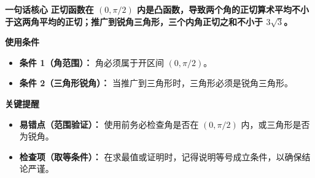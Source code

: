 \begin{summarybox}
\textbf{\textcolor{CSummary}{一句话核心}}
\textbf{正切函数在 $(0, \pi/2)$ 内是凸函数，导致两个角的正切算术平均不小于这两角平均的正切；推广到锐角三角形，三个内角正切之和不小于 $3\sqrt{3}$。}

\medskip
\textbf{\textcolor{CSummary}{使用条件}}
\begin{itemize}[leftmargin=*, itemsep=0.5em, topsep=0.4em]
    \item \textbf{条件 1（角范围）：} 角必须属于开区间 $(0, \pi/2)$。
    \item \textbf{条件 2（三角形锐角）：} 当推广到三角形时，三角形必须是锐角三角形。
\end{itemize}

\medskip
\textbf{\textcolor{CSummary}{关键提醒}}
\begin{itemize}[leftmargin=*, itemsep=0.5em, topsep=0.4em]
    \item \textbf{易错点（范围验证）：} 使用前务必检查角是否在 $(0, \pi/2)$ 内，或三角形是否为锐角。
    \item \textbf{检查项（取等条件）：} 在求最值或证明时，记得说明等号成立条件，以确保结论严谨。
\end{itemize}
\end{summarybox}
